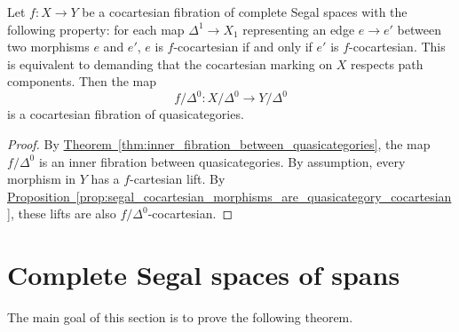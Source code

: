 \documentclass[main.tex]{subfiles}
\begin{document}
\begin{corollary}
  \label{cor:cocart_fib_between_css_gives_cocart_fib_of_quasicats}
  Let $f\colon X \to Y$ be a cocartesian fibration of complete Segal spaces with the following property: for each map $\Delta^{1} \to X_{1}$ representing an edge $e \to e'$ between two morphisms $e$ and $e'$, $e$ is $f$-cocartesian if and only if $e'$ is $f$-cocartesian. This is equivalent to demanding that the cocartesian marking on $X$ respects path components. Then the map
  \begin{equation*}
    f/\Delta^{0}\colon X/\Delta^{0} \to Y/\Delta^{0}
  \end{equation*}
  is a cocartesian fibration of quasicategories.
\end{corollary}
\begin{proof}
  By \hyperref[thm:inner_fibration_between_quasicategories]{Theorem~\ref*{thm:inner_fibration_between_quasicategories}}, the map $f/\Delta^{0}$ is an inner fibration between quasicategories. By assumption, every morphism in $Y$ has a $f$-cartesian lift. By \hyperref[prop:segal_cocartesian_morphisms_are_quasicategory_cocartesian]{Proposition~\ref*{prop:segal_cocartesian_morphisms_are_quasicategory_cocartesian}}, these lifts are also $f / \Delta^{0}$-cocartesian.
\end{proof}

\section{Complete Segal spaces of spans}
\label{sec:complete_segal_spaces_of_spans}

The main goal of this section is to prove the following theorem.
\end{document}
